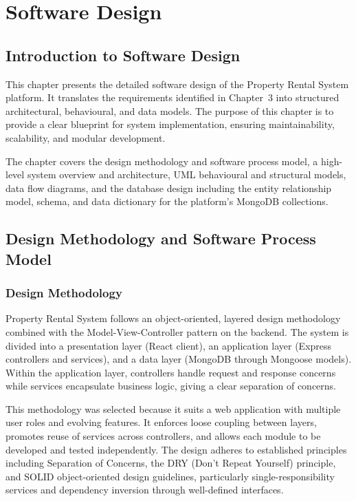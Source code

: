 \chapter{Software Design}

\section{Introduction to Software Design}

This chapter presents the detailed software design of the Property Rental System platform. It translates the requirements identified in Chapter~3 into structured architectural, behavioural, and data models. The purpose of this chapter is to provide a clear blueprint for system implementation, ensuring maintainability, scalability, and modular development.

The chapter covers the design methodology and software process model, a high-level system overview and architecture, UML behavioural and structural models, data flow diagrams, and the database design including the entity relationship model, schema, and data dictionary for the platform's MongoDB collections.

\section{Design Methodology and Software Process Model}

\subsection{Design Methodology}

Property Rental System follows an object-oriented, layered design methodology combined with the Model-View-Controller pattern on the backend. The system is divided into a presentation layer (React client), an application layer (Express controllers and services), and a data layer (MongoDB through Mongoose models). Within the application layer, controllers handle request and response concerns while services encapsulate business logic, giving a clear separation of concerns.

This methodology was selected because it suits a web application with multiple user roles and evolving features. It enforces loose coupling between layers, promotes reuse of services across controllers, and allows each module to be developed and tested independently. The design adheres to established principles including Separation of Concerns, the DRY (Don't Repeat Yourself) principle, and SOLID object-oriented design guidelines, particularly single-responsibility services and dependency inversion through well-defined interfaces.

